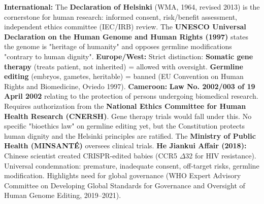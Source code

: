 \documentclass[11pt]{article}
\begin{document}
\begin{savaistu}
\textbf{International:} The \textbf{Declaration of Helsinki} (WMA, 1964, revised 2013) is the cornerstone for human research: informed consent, risk/benefit assessment, independent ethics committee (IEC/IRB) review. The \textbf{UNESCO Universal Declaration on the Human Genome and Human Rights (1997)} states the genome is "heritage of humanity" and opposes germline modifications "contrary to human dignity".
\textbf{Europe/West:} Strict distinction: \textbf{Somatic gene therapy} (treats patient, not inherited) = allowed with oversight. \textbf{Germline editing} (embryos, gametes, heritable) = banned (EU Convention on Human Rights and Biomedicine, Oviedo 1997).
\textbf{Cameroon:} \textbf{Law No. 2002/003 of 19 April 2002} relating to the protection of persons undergoing biomedical research. Requires authorization from the \textbf{National Ethics Committee for Human Health Research (CNERSH)}. Gene therapy trials would fall under this. No specific "bioethics law" on germline editing yet, but the Constitution protects human dignity and the Helsinki principles are ratified. The \textbf{Ministry of Public Health (MINSANTÉ)} oversees clinical trials.
\textbf{He Jiankui Affair (2018):} Chinese scientist created CRISPR-edited babies (CCR5 $\Delta$32 for HIV resistance). Universal condemnation: premature, inadequate consent, off-target risks, germline modification. Highlights need for global governance (WHO Expert Advisory Committee on Developing Global Standards for Governance and Oversight of Human Genome Editing, 2019–2021).
\end{savaistu}
\end{document}
